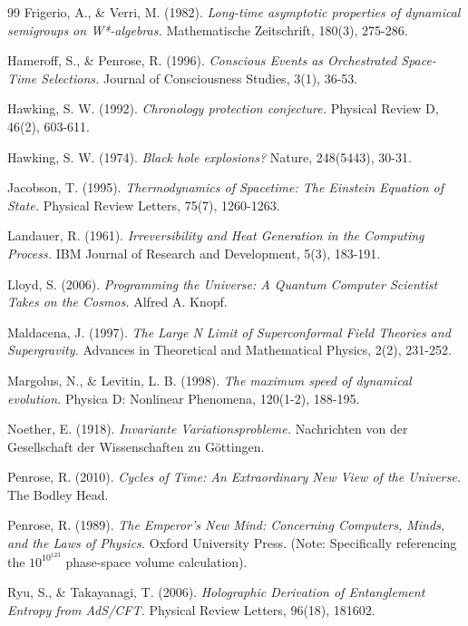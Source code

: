 \documentclass[12pt,openany]{book}
\theoremstyle{plain}
\theoremstyle{definition}
\theoremstyle{remark}
\begin{document}
\begin{thebibliography}{99}
Frigerio, A., \& Verri, M. (1982). 
\textit{Long-time asymptotic properties of dynamical semigroups on W*-algebras.} 
Mathematische Zeitschrift, 180(3), 275-286.

Hameroff, S., \& Penrose, R. (1996). \textit{Conscious Events as Orchestrated Space-Time Selections.} Journal of Consciousness Studies, 3(1), 36-53.

Hawking, S. W. (1992). \textit{Chronology protection conjecture.} Physical Review D, 46(2), 603-611.

Hawking, S. W. (1974). \textit{Black hole explosions?} Nature, 248(5443), 30-31.

Jacobson, T. (1995). \textit{Thermodynamics of Spacetime: The Einstein Equation of State.} Physical Review Letters, 75(7), 1260-1263.

Landauer, R. (1961). \textit{Irreversibility and Heat Generation in the Computing Process.} IBM Journal of Research and Development, 5(3), 183-191.

Lloyd, S. (2006). \textit{Programming the Universe: A Quantum Computer Scientist Takes on the Cosmos.} Alfred A. Knopf.

Maldacena, J. (1997). \textit{The Large N Limit of Superconformal Field Theories and Supergravity.} Advances in Theoretical and Mathematical Physics, 2(2), 231-252.

Margolus, N., \& Levitin, L. B. (1998). \textit{The maximum speed of dynamical evolution.} Physica D: Nonlinear Phenomena, 120(1-2), 188-195.

Noether, E. (1918). \textit{Invariante Variationsprobleme.} Nachrichten von der Gesellschaft der Wissenschaften zu G\"ottingen.

Penrose, R. (2010). \textit{Cycles of Time: An Extraordinary New View of the Universe.} The Bodley Head.

Penrose, R. (1989). 
\textit{The Emperor's New Mind: Concerning Computers, Minds, and the Laws of Physics.} 
Oxford University Press. (Note: Specifically referencing the $10^{10^{123}}$ phase-space volume calculation).

Ryu, S., \& Takayanagi, T. (2006). \textit{Holographic Derivation of Entanglement Entropy from AdS/CFT.} Physical Review Letters, 96(18), 181602.


\end{thebibliography}
\end{document}
